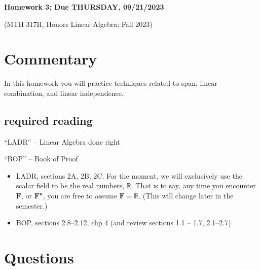\documentclass[12pt]{article}
\def\real{{\mathbb R}}
\begin{document}
\begin{LARGE}
    \begin{center}




        \textbf{Homework 3; Due THURSDAY, 09/21/2023}


        (MTH 317H, Honors Linear Algebra;  Fall 2023)
    \end{center}
\end{LARGE}
\vspace{0.15in}




\section{Commentary}

In this homework you will practice techniques related to span, linear combination, and linear independence.



\subsection{required reading}





\noindent
``LADR'' -- Linear Algebra done right


\noindent
``BOP'' -- Book of Proof

\begin{itemize}
    \item LADR, sections 2A, 2B, 2C.  For the moment, we will exclusively use the scalar field to be the real numbers, $\real$.  That is to say, any time you encounter $\mathbf{F}$, or $\mathbf{F^n}$, you are free to assume $\mathbf{F}=\real$.  (This will change later in the semester.)


    \item BOP, sections 2.8--2.12, chp 4  (and review sections 1.1 -- 1.7, 2.1--2.7)
\end{itemize}





\section{Questions}



\vspace{.5cm}
\end{document}
